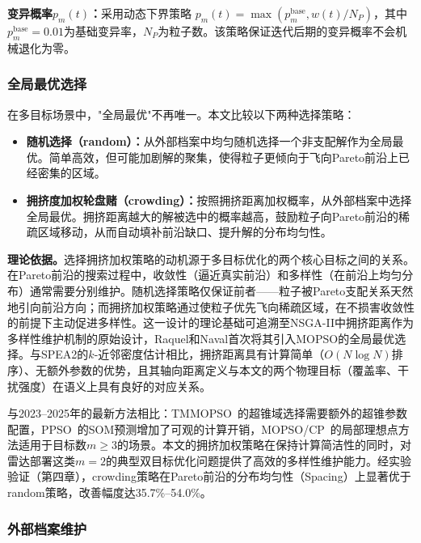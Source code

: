 \textbf{变异概率$p_m(t)$：}采用动态下界策略 $p_m(t) = \max(p_m^{\text{base}}, w(t)/N_P)$，其中$p_m^{\text{base}} = 0.01$为基础变异率，$N_P$为粒子数。该策略保证迭代后期的变异概率不会机械退化为零。

\subsubsection{全局最优选择}

在多目标场景中，"全局最优"不再唯一。本文比较以下两种选择策略：

\begin{itemize}
    \item \textbf{随机选择（random）：}从外部档案中均匀随机选择一个非支配解作为全局最优。简单高效，但可能加剧解的聚集，使得粒子更倾向于飞向Pareto前沿上已经密集的区域\cite{Coello2004}。
    \item \textbf{拥挤度加权轮盘赌（crowding）：}按照拥挤距离加权概率，从外部档案中选择全局最优。拥挤距离越大的解被选中的概率越高，鼓励粒子向Pareto前沿的稀疏区域移动，从而自动填补前沿缺口、提升解的分布均匀性\cite{Raquel2005}。
\end{itemize}

\textbf{理论依据。}选择拥挤加权策略的动机源于多目标优化的两个核心目标之间的关系。在Pareto前沿的搜索过程中，收敛性（逼近真实前沿）和多样性（在前沿上均匀分布）通常需要分别维护。随机选择策略仅保证前者——粒子被Pareto支配关系天然地引向前沿方向；而拥挤加权策略通过使粒子优先飞向稀疏区域，在不损害收敛性的前提下主动促进多样性。这一设计的理论基础可追溯至NSGA-II中拥挤距离作为多样性维护机制的原始设计\cite{Deb2002}，Raquel和Naval\cite{Raquel2005}首次将其引入MOPSO的全局最优选择。与SPEA2的$k$-近邻密度估计\cite{Zitzler2001}相比，拥挤距离具有计算简单（$O(N \log N)$排序）、无额外参数的优势，且其轴向距离定义与本文的两个物理目标（覆盖率、干扰强度）在语义上具有良好的对应关系。

与2023--2025年的最新方法相比：TMMOPSO~\cite{Liu2023}的超锥域选择需要额外的超锥参数配置，PPSO~\cite{Wang2024}的SOM预测增加了可观的计算开销，MOPSO/CP~\cite{Zhang2024}的局部理想点方法适用于目标数$m \geq 3$的场景。本文的拥挤加权策略在保持计算简洁性的同时，对雷达部署这类$m=2$的典型双目标优化问题提供了高效的多样性维护能力。经实验验证（第四章），crowding策略在Pareto前沿的分布均匀性（Spacing）上显著优于random策略，改善幅度达35.7\%--54.0\%。

\subsubsection{外部档案维护}


